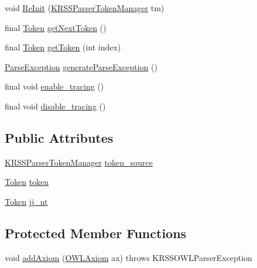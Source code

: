 \begin{DoxyCompactItemize}
void \hyperlink{classorg_1_1coode_1_1owl_1_1krssparser_1_1_k_r_s_s_parser_a0b21ef77ec7c92b013d24d267dcb7b99}{Re\-Init} (\hyperlink{classorg_1_1coode_1_1owl_1_1krssparser_1_1_k_r_s_s_parser_token_manager}{K\-R\-S\-S\-Parser\-Token\-Manager} tm)
\item 
final \hyperlink{classorg_1_1coode_1_1owl_1_1krssparser_1_1_token}{Token} \hyperlink{classorg_1_1coode_1_1owl_1_1krssparser_1_1_k_r_s_s_parser_aa64ad4be03a31804af8433f5e01b7a39}{get\-Next\-Token} ()
\item 
final \hyperlink{classorg_1_1coode_1_1owl_1_1krssparser_1_1_token}{Token} \hyperlink{classorg_1_1coode_1_1owl_1_1krssparser_1_1_k_r_s_s_parser_af13d4ee11bf504b2a1c1e367b71303af}{get\-Token} (int index)
\item 
\hyperlink{classorg_1_1coode_1_1owl_1_1krssparser_1_1_parse_exception}{Parse\-Exception} \hyperlink{classorg_1_1coode_1_1owl_1_1krssparser_1_1_k_r_s_s_parser_afa757cb05e89847f7a20fb09eeb3fca9}{generate\-Parse\-Exception} ()
\item 
final void \hyperlink{classorg_1_1coode_1_1owl_1_1krssparser_1_1_k_r_s_s_parser_aee53d0d0b1dcc5d8460acb0085cf7b8b}{enable\-\_\-tracing} ()
\item 
final void \hyperlink{classorg_1_1coode_1_1owl_1_1krssparser_1_1_k_r_s_s_parser_a3304a65d2425d682c312586f06fdbab5}{disable\-\_\-tracing} ()
\end{DoxyCompactItemize}
\subsection*{Public Attributes}
\begin{DoxyCompactItemize}
\item 
\hyperlink{classorg_1_1coode_1_1owl_1_1krssparser_1_1_k_r_s_s_parser_token_manager}{K\-R\-S\-S\-Parser\-Token\-Manager} \hyperlink{classorg_1_1coode_1_1owl_1_1krssparser_1_1_k_r_s_s_parser_a56f34282d0ce3a01bf4804da9bdd8773}{token\-\_\-source}
\item 
\hyperlink{classorg_1_1coode_1_1owl_1_1krssparser_1_1_token}{Token} \hyperlink{classorg_1_1coode_1_1owl_1_1krssparser_1_1_k_r_s_s_parser_ac312336ca2bb938dc41074fc3cdff390}{token}
\item 
\hyperlink{classorg_1_1coode_1_1owl_1_1krssparser_1_1_token}{Token} \hyperlink{classorg_1_1coode_1_1owl_1_1krssparser_1_1_k_r_s_s_parser_aa281caf14bd19ce18f512d12ba3fe119}{jj\-\_\-nt}
\end{DoxyCompactItemize}
\subsection*{Protected Member Functions}
\begin{DoxyCompactItemize}
\item 
void \hyperlink{classorg_1_1coode_1_1owl_1_1krssparser_1_1_k_r_s_s_parser_aa8731a9c7baf2e22789e6fd5e0ca4ecd}{add\-Axiom} (\hyperlink{interfaceorg_1_1semanticweb_1_1owlapi_1_1model_1_1_o_w_l_axiom}{O\-W\-L\-Axiom} ax)  throws K\-R\-S\-S\-O\-W\-L\-Parser\-Exception 
\end{DoxyCompactItemize}
